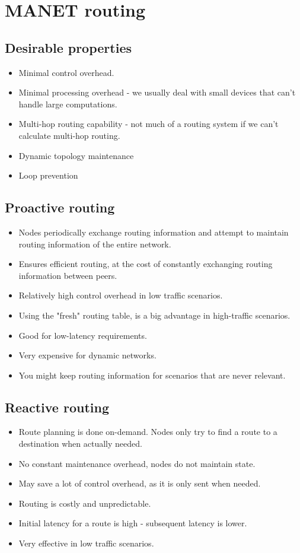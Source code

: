 	\section{MANET routing}
	
	\subsection{Desirable properties}
	\begin{itemize}
		\item Minimal control overhead.
		\item Minimal processing overhead - we usually deal with small devices that can't handle large computations.
		\item Multi-hop routing capability - not much of a routing system if we can't calculate multi-hop routing.
		\item Dynamic topology maintenance
		\item Loop prevention
	\end{itemize}
	
	\subsection{Proactive routing}
	\begin{itemize}
		\item Nodes periodically exchange routing information and attempt to maintain routing information of the entire network.
		\item Ensures efficient routing, at the cost of constantly exchanging routing information between peers.
		\item Relatively high control overhead in low traffic scenarios.
		\item Using the "fresh" routing table, is a big advantage in high-traffic scenarios.
		\item Good for low-latency requirements.
		\item Very expensive for dynamic networks.
		\item You might keep routing information for scenarios that are never relevant.
	\end{itemize}
	
	\subsection{Reactive routing}
	\begin{itemize}
		\item Route planning is done on-demand. Nodes only try to find a route to a destination when actually needed.
		\item No constant maintenance overhead, nodes do not maintain state.
		\item May save a lot of control overhead, as it is only sent when needed.
		\item Routing is costly and unpredictable.
		\item Initial latency for a route is high - subsequent latency is lower.
		\item Very effective in low traffic scenarios.
	\end{itemize}
	
